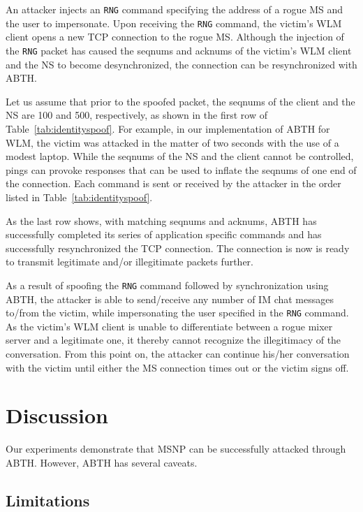 \documentclass{sig-alternate}
\begin{document}
An attacker injects an \texttt{RNG} command specifying the address of a rogue MS and the user to impersonate.
Upon receiving the \texttt{RNG} command, the victim's WLM client opens a new TCP connection to the rogue MS.
Although the injection of the \texttt{RNG} packet has caused the seqnums and acknums of the victim's WLM client and the NS to become desynchronized, the connection can be resynchronized with ABTH.

Let us assume that prior to the spoofed packet, the seqnums of the client and the NS are 100 and 500, respectively, as shown in the first row of Table~\ref{tab:identityspoof}.
For example, in our implementation of ABTH for WLM, the victim was attacked in the matter of two seconds with the use of a modest laptop.
While the seqnums of the NS and the client cannot be controlled, pings can provoke responses that can be used to inflate the seqnums of one end of the connection.
Each command is sent or received by the attacker in the order listed in Table~\ref{tab:identityspoof}.

As the last row shows, with matching seqnums and acknums, ABTH has successfully completed its series of application specific commands and has successfully resynchronized the TCP connection.
The connection is now is ready to transmit legitimate and/or illegitimate packets further.

As a result of spoofing the \texttt{RNG} command followed by synchronization using ABTH, the attacker is able to send/receive any number of IM chat messages to/from the victim, while impersonating the user specified in the \texttt{RNG} command.
As the victim's WLM client is unable to differentiate between a rogue mixer server and a legitimate one, it thereby cannot recognize the illegitimacy of the conversation.
From this point on, the attacker can continue his/her conversation with the victim until either the MS connection times out or the victim signs off.

\section{Discussion}
\label{sec:discussion}

Our experiments demonstrate that MSNP can be successfully attacked through ABTH.
However, ABTH has several caveats.

\subsection{Limitations}
\end{document}
